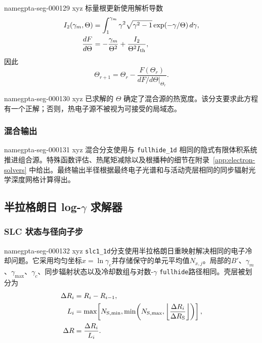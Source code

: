 \documentclass[twocolumn]{aastex702}
\makeatletter
\providecommand{\gptareaderanchor}[1]{\pdfdest name{#1} xyz}%
\providecommand{\gptareaderanchor}[1]{\special{pdf:dest (#1) [ @thispage /XYZ @xpos @ypos null ]}}%
\makeatother
\begin{document}
\gptareaderanchor{gpta-seg-000129}%
标量根更新使用解析导数
\begin{equation}
\begin{aligned}
I_2(\gamma_m,\Theta)&=
\int_1^{\gamma_m}\gamma^2\sqrt{\gamma^2-1}
\exp(-\gamma/\Theta)\,d\gamma,\\
\frac{dF}{d\Theta}&=
-\frac{\gamma_m}{\Theta^2}
+\frac{I_2}{\Theta^2I_{\rm th}},
\end{aligned}
\end{equation}
因此
\begin{equation}
\Theta_{r+1}=\Theta_r-\frac{F(\Theta_r)}
{\left.dF/d\Theta\right|_{\Theta_r}} .
\end{equation}

\gptareaderanchor{gpta-seg-000130}%
已求解的 \(\Theta\) 确定了混合源的热宽度。该分支要求此方程有一个正解；否则，热电子源不被视为可接受的局域态。

\subsubsection{混合输出}


\gptareaderanchor{gpta-seg-000131}%
混合分支使用与 \texttt{fullhide\_1d} 相同的隐式有限体积系统推进组合源。特殊函数评估、热尾矩减除以及根播种的细节在附录~\ref{app:electron-solvers} 中给出。最终输出半径根据最终电子光谱和与活动壳层相同的同步辐射光学深度网格计算得出。

\subsection{半拉格朗日 log-\texorpdfstring{\(\gamma\)}{gamma} 求解器}

\subsubsection{SLC 状态与径向子步}


\gptareaderanchor{gpta-seg-000132}%
\texttt{slc1\_1d}分支使用半拉格朗日重映射解决相同的电子冷却问题。它采用均匀坐标\(x=\ln\gamma_e\)并存储保守的单元平均值\(N_{x,j}\)。局部的\(B'\)、\(\gamma_m\)、\(\gamma_{\max}\)、\(\gamma_c\)、同步辐射状态以及冷却数组与对数-\(\gamma\) \texttt{fullhide}路径相同。壳层被划分为
\begin{equation}
\begin{aligned}
\Delta R_i&=R_i-R_{i-1},\\
L_i&=\max\!\left[
N_{\rm S,min},
\min\!\left(N_{\rm S,max},
\left\lfloor\frac{\Delta R_i}{\Delta R_{\rm S}}\right\rfloor\right)
\right],\\
\Delta R&=\frac{\Delta R_i}{L_i}.
\end{aligned}
\end{equation}
\end{document}
